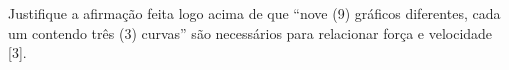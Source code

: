 Justifique a afirmação feita logo acima de que ``nove (9) gráficos diferentes, cada um contendo três (3) curvas'' são necessários para relacionar força e velocidade [3].
